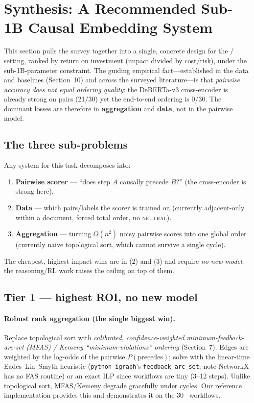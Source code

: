 \section{Synthesis: A Recommended Sub-1B Causal Embedding System}

This section pulls the survey together into a single, concrete design for the \aep/\ajo
setting, ranked by return on investment (impact divided by cost/risk), under the
sub-1B-parameter constraint. The guiding empirical fact---established in the data and
baselines (Section~10) and across the surveyed literature---is that \emph{pairwise
accuracy does not equal ordering quality}: the DeBERTa-v3 cross-encoder is already strong
on pairs (21/30) yet the end-to-end ordering is 0/30. The dominant losses are therefore in
\textbf{aggregation} and \textbf{data}, not in the pairwise model.

\subsection{The three sub-problems}
Any system for this task decomposes into:
\begin{enumerate}[leftmargin=1.4em,itemsep=0.1em]
  \item \textbf{Pairwise scorer} --- ``does step $A$ causally precede $B$?'' (the
  cross-encoder is strong here).
  \item \textbf{Data} --- which pairs/labels the scorer is trained on (currently
  adjacent-only within a document, forced total order, no \textsc{neutral}).
  \item \textbf{Aggregation} --- turning $O(n^2)$ noisy pairwise scores into one global
  order (currently naive topological sort, which cannot survive a single cycle).
\end{enumerate}
The cheapest, highest-impact wins are in (2) and (3) and require \emph{no new model}; the
reasoning/RL work raises the ceiling on top of them.

\subsection{Tier 1 --- highest ROI, no new model}
\paragraph{Robust rank aggregation (the single biggest win).}
Replace topological sort with \emph{calibrated, confidence-weighted minimum-feedback-arc-set
(MFAS) / Kemeny ``minimum-violations'' ordering} (Section~7). Edges are weighted by the
log-odds of the pairwise $P(\text{precedes})$; solve with the linear-time Eades--Lin--Smyth
heuristic (\texttt{python-igraph}'s \texttt{feedback\_arc\_set}; note NetworkX has no FAS
routine) or an exact ILP since workflows are tiny (3--12 steps). Unlike topological sort,
MFAS/Kemeny degrade gracefully under cycles. Our reference implementation provides this and
demonstrates it on the 30 \ajo\ workflows.

